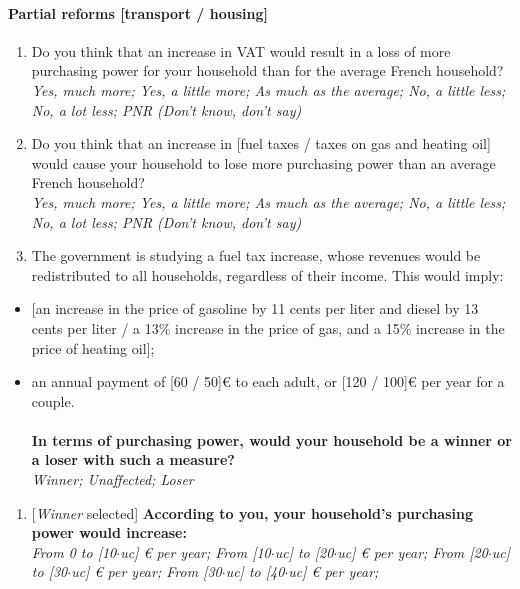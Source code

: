 \documentclass[12pt]{article} %
\begin{document}
\begin{appendices}
\paragraph{Partial reforms {[}transport / housing{]}}
\begin{enumerate}[resume,leftmargin=*]
\item Do you think that an increase in VAT would result in a loss of more
purchasing power for your household than for the average French household?
\emph{}\\
\emph{Yes, much more; Yes, a little more; As much as the average;
No, a little less; No, a lot less; PNR (Don't know, don't say)} 
\item Do you think that an increase in {[}fuel taxes / taxes on gas and
heating oil{]} would cause your household to lose more purchasing
power than an average French household? \emph{}\\
\emph{Yes, much more; Yes, a little more; As much as the average;
No, a little less; No, a lot less; PNR (Don't know, don't say)}
\item The government is studying a fuel tax increase, whose revenues would
be redistributed to all households, regardless of their income. This
would imply: 
\end{enumerate}
\begin{itemize}
\item {[}an increase in the price of gasoline by 11 cents per liter and
diesel by 13 cents per liter / a 13\% increase in the price of gas,
and a 15\% increase in the price of heating oil{]}; 
\item an annual payment of {[}60 / 50{]}\euro{} to each adult, or {[}120 / 100{]}\euro{}
per year for a couple. \\
\\
\textbf{In terms of purchasing power, would your household be a winner
or a loser with such a measure?} \emph{}\\
\emph{Winner; Unaffected; Loser} 
\end{itemize}
\begin{enumerate}[resume,leftmargin=*]
\item {[}\emph{Winner} selected{]} \textbf{According to you, your household's
purchasing power would increase:} \emph{}\\
\emph{From 0 to {[}10$\cdot$uc{]} \euro{} per year; From {[}10$\cdot$uc{]}
to {[}20$\cdot$uc{]} \euro{} per year; From {[}20$\cdot$uc{]} to {[}30$\cdot$uc{]}
\euro{} per year; From {[}30$\cdot$uc{]} to {[}40$\cdot$uc{]} \euro{} per year;
}
\end{enumerate}
\end{appendices}
\end{document}

